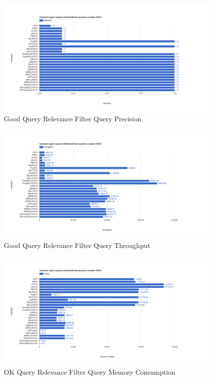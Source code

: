 \begin{figure}[!htbp]
    \centering
    \includegraphics[width=\textwidth]{img/app3-gqr-p.png}
    \caption{Good Query Relevance Filter Query Precision}
\end{figure}
\begin{figure}[!htbp]
    \centering
    \includegraphics[width=\textwidth]{img/app3-gqr-t.png}
    \caption{Good Query Relevance Filter Query Throughput}
\end{figure}
\begin{figure}[!htbp]
    \centering
    \includegraphics[width=\textwidth]{img/app3-oqr-m.png}
    \caption{OK Query Relevance Filter Query Memory Consumption}
\end{figure}
